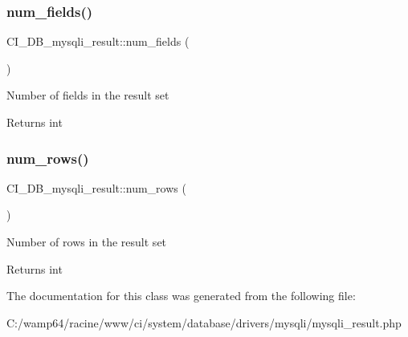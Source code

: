 \subsubsection{\texorpdfstring{num\+\_\+fields()}{num\_fields()}}
{\footnotesize\ttfamily C\+I\+\_\+\+D\+B\+\_\+mysqli\+\_\+result\+::num\+\_\+fields (\begin{DoxyParamCaption}{ }\end{DoxyParamCaption})}

Number of fields in the result set

\begin{DoxyReturn}{Returns}
int 
\end{DoxyReturn}
\mbox{\label{class_c_i___d_b__mysqli__result_a74083a12d5c0bf1c72ce48255a76cb2c}} 
\subsubsection{\texorpdfstring{num\+\_\+rows()}{num\_rows()}}
{\footnotesize\ttfamily C\+I\+\_\+\+D\+B\+\_\+mysqli\+\_\+result\+::num\+\_\+rows (\begin{DoxyParamCaption}{ }\end{DoxyParamCaption})}

Number of rows in the result set

\begin{DoxyReturn}{Returns}
int 
\end{DoxyReturn}


The documentation for this class was generated from the following file\+:\begin{DoxyCompactItemize}
\item 
C\+:/wamp64/racine/www/ci/system/database/drivers/mysqli/mysqli\+\_\+result.\+php\end{DoxyCompactItemize}
